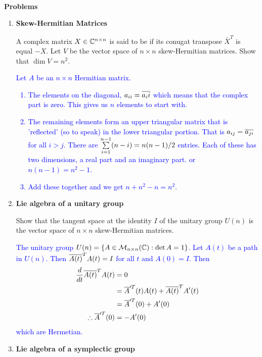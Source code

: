 \documentclass[12pt,a4paper]{report}
\newcommand{\BLUE}[1]{\textcolor{blue}{#1}}
\begin{document}
\noindent \textbf{\\\large{Problems}}

\begin{enumerate}[label=\textbf{16.\arabic*.}]

	\item \textbf{Skew-Hermitian Matrices}
	
	A complex matrix $X \in \mathbb{C}^{n\times n}$ is said to be  if its conugat transpose $\bar{X}^T$ is equal $-X$.  Let $V$ be the vector space of $n \times n$ skew-Hermitian matrices.  Show that $\dim V = n^2$.
	
	\BLUE{Let $A$ be an $n \times n$ Hermitian matrix.  
	\begin{enumerate}
		\item The elements on the diagonal, $a_{ii}=\overline{a_ii}$ which means that the complex part is zero. This gives us $n$ elements to start with. 
		\item The remaining elements form an upper triangular matrix that is 'reflected' (so to speak) in the lower triangular portion.  That is $a_{ij} = \overline{a_{ji}}$ for all $i > j$.  There are $\underset{i=1}{\overset{n-1}{\sum}}(n-i) = n(n-1)/2$ entries.  Each of these has two dimensions, a real part and an imaginary part.  or $n(n-1)=n^2-1$.
		\item Add these together and we get $n+n^2-n=n^2$.
	\end{enumerate} 
	}
	
	\item \textbf{Lie algebra of a unitary group}
	
	Show that the tangent space at the identity $I$ of the unitary group $U(n)$ is the vector space of $n \times n$ skew-Hermitian matrices.
	
	\BLUE{The unitary group $U(n)=\{A\in \mathcal{M}_{n\times n}(\mathbb{C}) : \det A = 1\}$.  Let $A(t)$ be a path in $U(n)$.  Then $\overline{A(t)}^TA(t) = I$ for all $t$ and $A(0)=I$.  Then 
	\begin{align*}
		\frac{d}{dt}\overline{A(t)}^TA(t) &= 0\\
		&= \overline{A}'^T(t)A(t) + \overline{A(t)}^T A'(t) \\
		&= \overline{A}'^T(0) +  A'(0) \\
		\therefore \overline{A}'^T(0) &= - A'(0)
	\end{align*}which are Hermetian.
	}
	
	\item \textbf{Lie algebra of a symplectic group}
	

\end{enumerate}
\end{document}
